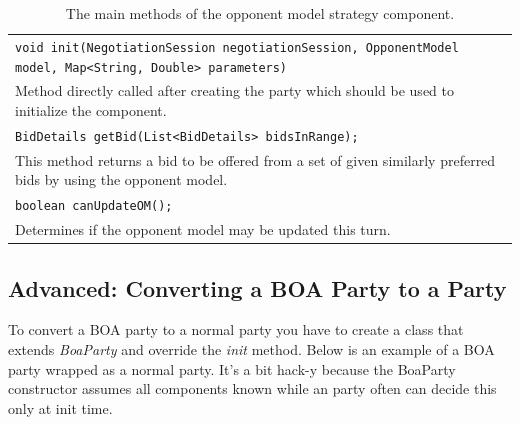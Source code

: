\documentclass[]{article}
\begin{document}
\begin{table}[h]
\begin{tabular}{m{}}
\hline
\texttt{void init(NegotiationSession negotiationSession, OpponentModel model, Map<String, Double> parameters)}\\
Method directly called after creating the party which should be used to initialize the component.\\
\hline
\texttt{BidDetails getBid(List<BidDetails> bidsInRange);}\\
This method returns a bid to be offered from a set of given similarly preferred bids by using the opponent model.\\
\hline
\texttt{boolean canUpdateOM();}\\
Determines if the opponent model may be updated this turn.\\
\hline
\end{tabular}
\caption{The main methods of the opponent model strategy component.}
\label{tab:BOAoms}
\end{table}





\subsection{Advanced: Converting a BOA Party to a Party}
To convert a BOA party to a normal party you have to create a class that extends \textit{BoaParty} and override the \textit{init} method. Below is an example of a BOA party wrapped as a normal party. It's a bit hack-y because the BoaParty constructor assumes all components known  while an party often can decide this only at init time.
\end{document}
